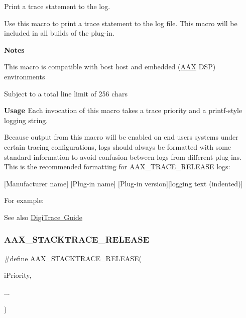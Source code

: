 Print a trace statement to the log. 

Use this macro to print a trace statement to the log file. This macro will be included in all builds of the plug-\/in.

{\bfseries{Notes }}
\begin{DoxyItemize}
\item This macro is compatible with bost host and embedded (\mbox{\hyperlink{a00852}{A\+AX}} D\+SP) environments
\item Subject to a total line limit of 256 chars
\end{DoxyItemize}

{\bfseries{Usage }} Each invocation of this macro takes a trace priority and a {\ttfamily printf}-\/style logging string.

Because output from this macro will be enabled on end users\textquotesingle{} systems under certain tracing configurations, logs should always be formatted with some standard information to avoid confusion between logs from different plug-\/ins. This is the recommended formatting for A\+A\+X\+\_\+\+T\+R\+A\+C\+E\+\_\+\+R\+E\+L\+E\+A\+SE logs\+:

{\ttfamily \mbox{[}Manufacturer name\mbox{]} \mbox{[}Plug-\/in name\mbox{]} \mbox{[}Plug-\/in version\mbox{]}\mbox{[}logging text (indented)\mbox{]} }

For example\+:


\begin{DoxyCode}{0}
\end{DoxyCode}


\begin{DoxySeeAlso}{See also}
\mbox{\hyperlink{a00834}{Digi\+Trace Guide}} 
\end{DoxySeeAlso}
\mbox{\label{a00395_a51f7dcc4ce960ab8855ec97f031a1463}} 
\subsubsection{\texorpdfstring{AAX\_STACKTRACE\_RELEASE}{AAX\_STACKTRACE\_RELEASE}}
{\footnotesize\ttfamily \#define A\+A\+X\+\_\+\+S\+T\+A\+C\+K\+T\+R\+A\+C\+E\+\_\+\+R\+E\+L\+E\+A\+SE(\begin{DoxyParamCaption}\item[{}]{i\+Priority,  }\item[{}]{... }\end{DoxyParamCaption})}

